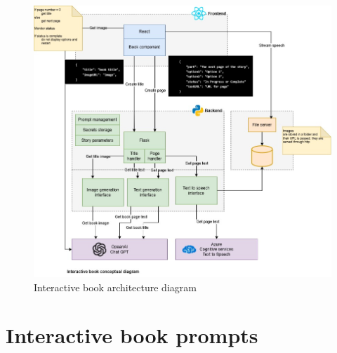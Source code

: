 \documentclass[conference]{IEEEtran}
\begin{document}
	\begin{figure}[H]
		\centering
		\includegraphics[width=0.9\linewidth]{"img/img-ARI3333-project-conceptual-diagram (1)"}
		\caption{Interactive book architecture diagram}
		\label{fig:img-ari3333-project-conceptual-diagram-1}
	\end{figure}


\pagebreak
\section{Interactive book prompts}
\end{document}
